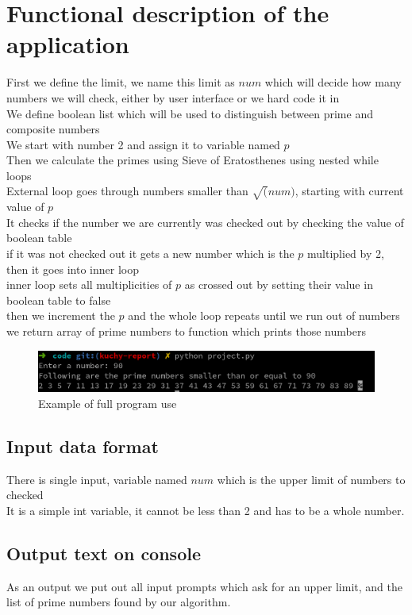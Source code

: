 \documentclass[12pt]{article}
\begin{document}
\section{Functional description of the application}
First we define the limit, we name this limit as $num$ which will decide how many numbers we will check, either by user interface or we hard code it in \\ 
We define boolean list which will be used to distinguish between prime and composite numbers \\ 
We start with number 2 and assign it to variable named $p$ \\ 
Then we calculate the primes using Sieve of Eratosthenes using nested while loops \\ 
External loop goes through numbers smaller than $\sqrt(num)$, starting with current value of $p$ \\ 
It checks if the number we are currently was checked out by checking the value of boolean table \\ 
if it was not checked out it gets a new number which is the $p$ multiplied by 2, then it goes into inner loop \\ 
inner loop sets all multiplicities of $p$ as crossed out by setting their value in boolean table to false \\ 
then we increment the $p$ and the whole loop repeats until we run out of numbers \\ 
we return array of prime numbers to function which prints those numbers 

\begin{figure}[H]
\centering
\includegraphics[width=\textwidth]
{screenshoot/program_use.png}
\caption{Example of full program use }

\end{figure}

\subsection{Input data format}
There is single input, variable named $num$ which is the upper limit of numbers to checked \\ 
It is a simple int variable, it cannot be less than 2 and has to be a whole number. 
\subsection{Output text on console}
As an output we put out all input prompts which ask for an upper limit, and the list of prime numbers found by our algorithm. 
\end{document}

